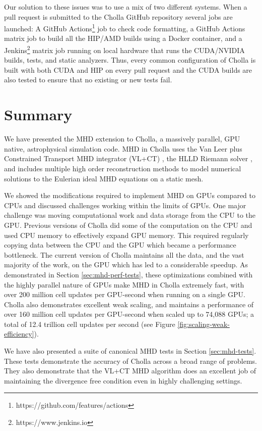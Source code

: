 \documentclass[modern, linenumbers]{aastex631}
\begin{document}
Our solution to these issues was to use a mix of two different systems. When a pull request is submitted to the Cholla GitHub repository several jobs are launched: A GitHub Actions\footnote{https://github.com/features/actions} job to check code formatting, a GitHub Actions matrix job to build all the HIP/AMD builds using a Docker container, and a Jenkins\footnote{https://www.jenkins.io} matrix job running on local hardware that runs the CUDA/NVIDIA builds, tests, and static analyzers. Thus, every common configuration of Cholla is built with both CUDA and HIP on every pull request and the CUDA builds are also tested to ensure that no existing or new tests fail.


\section{Summary}
\label{sec:summary}

We have presented the MHD extension to Cholla, a massively parallel, GPU native, astrophysical simulation code. MHD in Cholla uses the Van Leer plus Constrained Transport MHD integrator (VL+CT) \citep{stone_2009}, the HLLD Riemann solver \citep{hlld_2005}, and includes multiple high order reconstruction methods to model numerical solutions to the Eulerian ideal MHD equations on a static mesh.

We showed the modifications required to implement MHD on GPUs compared to CPUs and discussed challenges working within the limits of GPUs. One major challenge was moving computational work and data storage from the CPU to the GPU. Previous versions of Cholla did some of the computation on the CPU and used CPU memory to effectively expand GPU memory. This required regularly copying data between the CPU and the GPU which became a performance bottleneck. The current version of Cholla maintains all the data, and the vast majority of the work, on the GPU which has led to a considerable speedup. As demonstrated in Section \ref{sec:mhd-perf-tests}, these optimizations combined with the highly parallel nature of GPUs make MHD in Cholla extremely fast, with over 200 million cell updates per GPU-second when running on a single GPU. Cholla also demonstrates excellent weak scaling, and maintains a performance of over 160 million cell updates per GPU-second when scaled up to 74,088 GPUs; a total of 12.4 trillion cell updates per second (see Figure \ref{fig:scaling-weak-efficiency}).

We have also presented a suite of canonical MHD tests in Section \ref{sec:mhd-tests}. These tests demonstrate the accuracy of Cholla across a broad range of problems. They also demonstrate that the VL+CT MHD algorithm does an excellent job of maintaining the divergence free condition even in highly challenging settings.
\end{document}
